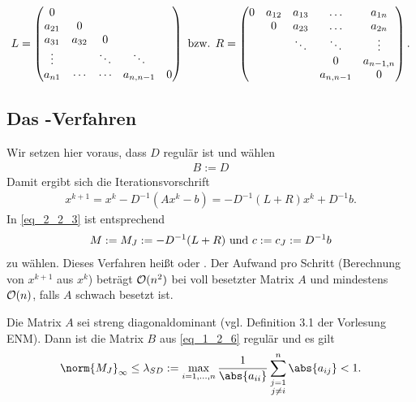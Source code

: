 \begin{align}
	L = 
	\begin{pmatrix}
		0      &        &        &           & \\
		a_{21} & 0      &        &           & \\
		a_{31} & a_{32} & 0      &           & \\
		\vdots &        & \ddots & \ddots    & \\
		a_{n1} & \cdots & \cdots & a_{n,n-1} & 0
	\end{pmatrix}
	 \text{ bzw. } R = 
	 \begin{pmatrix}
	 0      & a_{12} & a_{13} & \dots     & a_{1n}\\
	        & 0      & a_{23} & \dots     & a_{2n}\\
	        &        & \ddots & \ddots    & \vdots\\
	        &        &        & 0         & a_{n-1,n}\\
	        &        &        & a_{n,n-1} & 0
	 \end{pmatrix}.\notag
\end{align}

\subsection{Das -Verfahren}
Wir setzen hier voraus, dass $D$ regulär ist und wählen
\begin{align}
	B:= D \label{eq_1_2_6}
\end{align}
Damit ergibt sich die Iterationsvorschrift
\begin{align}
	x^{k+1} = x^k - D^{-1}(Ax^k - b) = -D^{-1}(L+R)x^k+D^{-1}b. \label{eq_1_2_7}
\end{align}
In \cref{eq_2_2_3} ist entsprechend
\begin{align}
	M:= M_J := -D^{-1}(L+R) \text{ und } c:= c_J := D^{-1}b\notag 
\end{align}
zu wählen. Dieses Verfahren heißt  oder . Der Aufwand pro Schritt (Berechnung von $x^{k+1}$ aus $x^k$) beträgt $\operatorname{\mathcal{O}}(n^2)$ bei voll besetzter Matrix $A$ und mindestens $\operatorname{\mathcal{O}}(n)$, falls $A$ schwach besetzt ist.

\begin{proposition}
	Die Matrix $A$ sei streng diagonaldominant (vgl. Definition 3.1 der Vorlesung ENM). Dann ist die Matrix $B$ aus \cref{eq_1_2_6} regulär und es gilt
	\begin{align}
	\norm{M_J}_{\infty} \le \lambda_{SD} := \max_{i = 1,\dots,n} \frac{1}{\abs{a_{ii}}} \sum_{\substack{j =1 \\ j\neq i}}^n \abs{a_{ij}} < 1. \notag
	\end{align}
\end{proposition}

